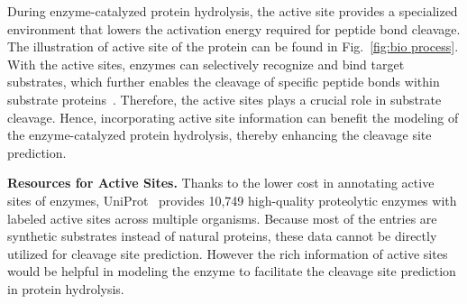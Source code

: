 During enzyme-catalyzed protein hydrolysis, the active site provides a specialized environment that lowers the activation energy required for peptide bond cleavage.  The illustration of active site of the protein can be found in Fig.~\ref{fig:bio process}. 
With the active sites, enzymes can selectively recognize and bind target substrates, which further enables the cleavage of specific peptide bonds within substrate proteins~\cite{activesites}. 
Therefore, the active sites plays a crucial role in substrate cleavage. 
Hence, incorporating active site information can benefit the modeling of the enzyme-catalyzed protein hydrolysis, thereby enhancing the cleavage site prediction. 













\textbf{Resources for Active Sites.}
Thanks to the lower cost in annotating active sites of enzymes, UniProt~\cite{Uniprot} provides 10{,}749 high-quality proteolytic enzymes with labeled active sites across multiple organisms. 
Because most of the entries are synthetic substrates instead of natural proteins, these data cannot be directly utilized for cleavage site prediction.  
However the rich information of active sites would be helpful in modeling the enzyme to facilitate the cleavage site prediction in protein hydrolysis.



